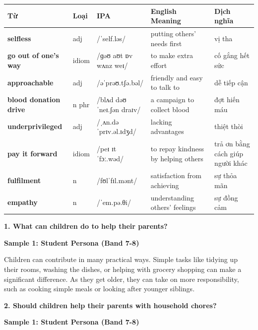 \vspace{0.8em}
\begin{center}
\renewcommand{\arraystretch}{1.65}
\begin{tabularx}{\textwidth}{|V{0.22\textwidth}|C{0.07\textwidth}|I{0.20\textwidth}|Y|V{0.18\textwidth}|}
\hline
{}
\textbf{Từ} & \textbf{Loại} & \textbf{IPA} & \textbf{English Meaning} & \textbf{Dịch nghĩa} \\
\hline
\textbf{selfless} & adj & /ˈself.ləs/ & putting others' needs first & vị tha \\ \hline
\textbf{go out of one's way} & idiom & /ɡəʊ aʊt ɒv wʌnz weɪ/ & to make extra effort & cố gắng hết sức \\ \hline
\textbf{approachable} & adj & /əˈprəʊ.tʃə.bəl/ & friendly and easy to talk to & dễ tiếp cận \\ \hline
\textbf{blood donation drive} & n phr & /blʌd dəʊˈneɪ.ʃən draɪv/ & a campaign to collect blood & đợt hiến máu \\ \hline
\textbf{underprivileged} & adj & /ˌʌn.dəˈprɪv.əl.ɪdʒd/ & lacking advantages & thiệt thòi \\ \hline
\textbf{pay it forward} & idiom & /peɪ ɪt ˈfɔː.wəd/ & to repay kindness by helping others & trả ơn bằng cách giúp người khác \\ \hline
\textbf{fulfilment} & n & /fʊlˈfɪl.mənt/ & satisfaction from achieving & sự thỏa mãn \\ \hline
\textbf{empathy} & n & /ˈem.pə.θi/ & understanding others' feelings & sự đồng cảm \\ \hline
\end{tabularx}
\end{center}

\partthreeheader

\begin{ieltsquestion}
\textbf{1. What can children do to help their parents?}
\end{ieltsquestion}
\textbf{Sample 1: Student Persona (Band 7-8)}

Children can contribute in many practical ways. Simple tasks like tidying up their rooms, washing the dishes, or helping with grocery shopping can make a significant difference. As they get older, they can take on more responsibility, such as cooking simple meals or looking after younger siblings.

\separator

\begin{ieltsquestion}
\textbf{2. Should children help their parents with household chores?}
\end{ieltsquestion}
\textbf{Sample 1: Student Persona (Band 7-8)}

